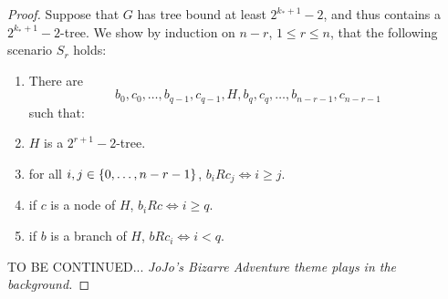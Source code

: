 \begin{proof}
            Suppose that $G$ has tree bound at least $2^{k_*+1}-2$, and thus contains a $2^{k_*+1}-2$-tree.
            We show by induction on $n-r$, $1 \leq r \leq n$, that the following scenario $S_r$ holds:
            \begin{enumerate}
                \item\label{itm:tree_implies_order.1} There are
                    \[
                        b_0, c_0, \dots, b_{q-1}, c_{q-1}, H, b_q, c_q, \dots, b_{n-r-1}, c_{n-r-1}
                    \]
                    such that:
                \item\label{itm:tree_implies_order.2} $H$ is a $2^{r+1}-2$-tree.
                \item\label{itm:tree_implies_order.3} for all $i,j \in \left\{ 0, \dots, n-r-1 \right\}$, $b_i R c_j \Leftrightarrow i \geq j$.
                \item\label{itm:tree_implies_order.4} if $c$ is a node of $H$, $b_i R c \Leftrightarrow i \geq q$.
                \item\label{itm:tree_implies_order.5} if $b$ is a branch of $H$, $b R c_i \Leftrightarrow i < q$.
            \end{enumerate}

            TO BE CONTINUED...
            \emph{JoJo's Bizarre Adventure theme plays in the background.}
        \end{proof}
